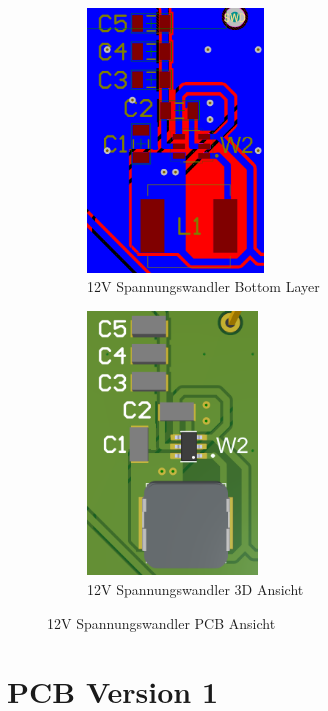 \begin{inhalt}
\begin{figure}[H]
  \begin{subfigure}[b]{0.48\textwidth}
    \centering
    \includegraphics[height=7cm]{files/Tobias/pics/Schaltungen/PCB/12V_Spannungswandler_PCB_.PNG}
    \caption{12V Spannungswandler Bottom Layer}
    \label{fig:12V_Bottom_layer}
  \end{subfigure}
  \hfill
  \begin{subfigure}[b]{0.48\textwidth}
    \centering
    \includegraphics[height=7cm]{files/Tobias/pics/Schaltungen/PCB/12V_Spannungswandler_PCB_3D.PNG}
    \caption{12V Spannungswandler 3D Ansicht}
    \label{fig:12V_3D_Ansicht}
  \end{subfigure}

  \caption{12V Spannungswandler PCB Ansicht}
  \label{fig:pcb_layers}
\end{figure}
      


   \section{PCB Version 1}
   \label{ref:PCB_Version_1}



\end{inhalt}
